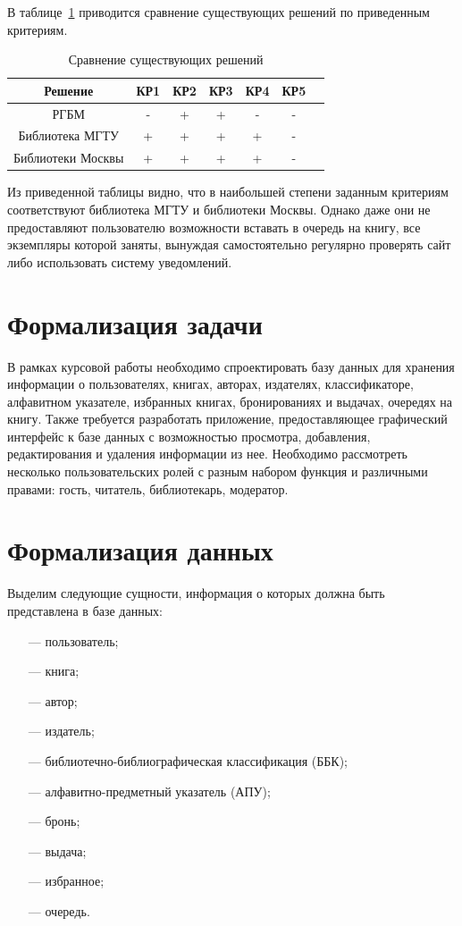 В таблице~\ref{tbl:versus} приводится сравнение существующих решений по приведенным критериям.

\begin{table}[H]
    \begin{center}
        \caption{Сравнение существующих решений}
        \begin{tabular}{|c|c|c|c|c|c|c|}
            \hline
            \textbf{Решение} & \textbf{КР1} & \textbf{КР2} & \textbf{КР3} & \textbf{КР4} & \textbf{КР5}\\
            \hline
            РГБМ & - & + & + & - & - \\
            \hline
            Библиотека МГТУ & + & + & + & + & - \\
            \hline
            Библиотеки Москвы & + & + & + & + & - \\
            \hline
        \end{tabular}
        \label{tbl:versus}
    \end{center}
\end{table}

Из приведенной таблицы видно, что в наибольшей степени заданным критериям соответствуют библиотека МГТУ и библиотеки Москвы. Однако даже они не предоставляют пользователю возможности вставать в очередь на книгу, все экземпляры которой заняты, вынуждая самостоятельно регулярно проверять сайт либо использовать систему уведомлений. 

\section{Формализация задачи}
В рамках курсовой работы необходимо спроектировать базу данных для хранения информации о пользователях, книгах, авторах, издателях, классификаторе, алфавитном указателе, избранных книгах, бронированиях и выдачах, очередях на книгу. Также требуется разработать приложение, предоставляющее графический интерфейс к базе данных с возможностью просмотра, добавления, редактирования и удаления информации из нее. Необходимо рассмотреть несколько пользовательских ролей с разным набором функция и различными правами: гость, читатель, библиотекарь, модератор.

\section{Формализация данных}
Выделим следующие сущности, информация о которых должна быть представлена в базе данных:
\begin{itemize}
	\item[---] пользователь;
	\item[---] книга;
	\item[---] автор;
	\item[---] издатель;
	\item[---] библиотечно-библиографическая классификация (ББК);
	\item[---] алфавитно-предметный указатель (АПУ);
	\item[---] бронь;
	\item[---] выдача;
	\item[---] избранное;
	\item[---] очередь.
\end{itemize}

